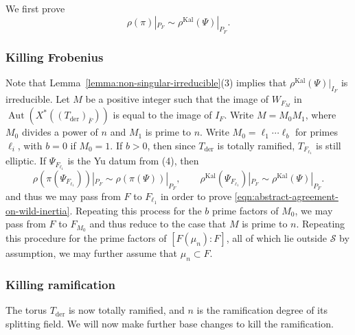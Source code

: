 \documentclass[reqno]{amsart}
\numberwithin{equation}{subsection}
\newcommand{\ol}[1]{\overline{#1}}
\newcommand\cS{\mathcal{S}}
\DeclareMathOperator{\Aut}{Aut}
\DeclareMathOperator{\Kal}{Kal}
\DeclareMathOperator{\der}{der}
\theoremstyle{remark}
\numberwithin{equation}{subsection}
\numberwithin{figure}{subsection}
\begin{document}
We first prove
\begin{equation}\label{eqn:abstract-agreement-on-wild-inertia}
\rho(\pi)|_{P_F} \sim \rho^{\Kal}(\Psi)|_{P_F}.
\end{equation}

\subsubsection{Killing Frobenius} Note that Lemma~\ref{lemma:non-singular-irreducible}(3) implies that $\rho^{\Kal}(\Psi)|_{I_F}$ is irreducible. Let $M$ be a positive integer such that the image of $W_{F_M}$ in $\Aut(X^*((T_{\der})_{\ol F}))$ is equal to the image of $I_F$. Write $M = M_0M_1$, where $M_0$ divides a power of $n$ and $M_1$ is prime to $n$. Write $M_0 = \ell_1 \cdots \ell_b$ for primes $\ell_i$, with $b=0$ if $M_0=1$. If $b > 0$, then since $T_{\der}$ is totally ramified, $T_{F_{\ell_1}}$ is still elliptic. If $\Psi_{F_{\ell_1}}$ is the Yu datum from (4), then
\begin{equation}\label{eq:prime-switching-wild-comparison}
\rho(\pi(\Psi_{F_{\ell_1}}))|_{P_F}
\sim \rho(\pi(\Psi))|_{P_F},
\qquad
\rho^{\Kal}(\Psi_{F_{\ell_1}})|_{P_F}
\sim \rho^{\Kal}(\Psi)|_{P_F}.
\end{equation}
and thus we may pass from $F$ to $F_{\ell_1}$ in order to prove \eqref{eqn:abstract-agreement-on-wild-inertia}. Repeating this process for the $b$ prime factors of $M_0$, we may pass from $F$ to $F_{M_0}$ and thus reduce to the case that $M$ is prime to $n$. Repeating this procedure for the prime factors of $[F(\mu_n):F]$, all of which lie outside $\cS$ by assumption, we may further assume that $\mu_n\subset F$.

\subsubsection{Killing ramification} The torus $T_{\der}$ is now totally ramified, and $n$ is the ramification degree of its splitting field. We will now make further base changes to kill the ramification. 
\end{document}
